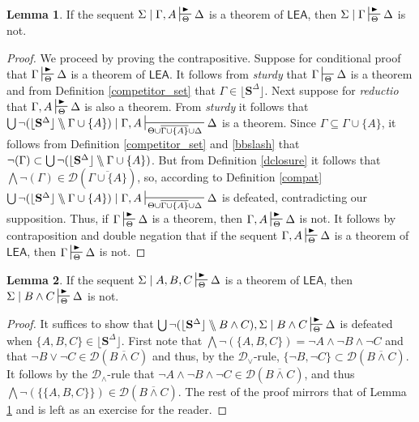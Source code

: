 \documentclass{article}
\theoremstyle{definition}
\theoremstyle{definition}
\theoremstyle{definition}
\newtheorem{lemma}{Lemma}
\theoremstyle{definition}
\theoremstyle{remark}
\theoremstyle{definition}
\theoremstyle{definition}
\begin{document}
\begin{lemma}\label{Minim}
	If the sequent $ \Sigma\mid \Gamma, A \sststile{\Theta}{\RHD} \Delta $ is a theorem of $ \mathsf{LEA}$, then  $ \Sigma\mid \Gamma \sststile{\Theta}{\RHD} \Delta $ is not.
	
	\begin{proof}
		We proceed by proving the contrapositive. Suppose for conditional proof that $ \Gamma\sststile{\Theta}{\RHD} \Delta $ is a theorem of $ \mathsf{LEA}$. It follows from \textit{sturdy} that $ \Gamma\sststile{\Theta}{} \Delta $ is a theorem and from Definition \ref{competitor_set} that $ \Gamma \in \lfloor \mathbf{S}^\Delta \rfloor$. Next suppose for \textit{reductio} that $ \Gamma, A \sststile{\Theta}{\RHD} \Delta $ is also a theorem. From \textit{sturdy} it follows that $\bigcup\neg(\lfloor \mathbf{S}^\Delta \rfloor\bbslash\Gamma\cup \{A\})\mid\Gamma, A \sststile{\Theta\cup \overline{\Gamma\cup \{A\} }\cup\Delta}{}\Delta$ is a theorem. Since $ \Gamma \subseteq \Gamma\cup\{A\} $, it follows from Definition \ref{competitor_set} and \ref{bbslash} that $ \neg(\Gamma) \subset \bigcup\neg(\lfloor \mathbf{S}^\Delta \rfloor\bbslash\Gamma\cup \{A\}) $. But from Definition \ref{dclosure} it follows that $ \bigwedge\neg(\Gamma) \in \mathcal{D}(\overline{\Gamma\cup\{A\}}) $, so, according to Definition \ref{compat} $\bigcup\neg(\lfloor \mathbf{S}^\Delta \rfloor\bbslash\Gamma\cup \{A\})\mid\Gamma, A \sststile{\Theta\cup \overline{\Gamma\cup \{A\} }\cup\Delta}{}\Delta$ is defeated, contradicting our supposition. Thus, if  $ \Gamma\sststile{\Theta}{\RHD} \Delta $ is a theorem, then $ \Gamma, A \sststile{\Theta}{\RHD} \Delta $ is not. It follows by contraposition and double negation that if the sequent $ \Gamma, A \sststile{\Theta}{\RHD} \Delta $ is a theorem of $ \mathsf{LEA}$, then  $ \Gamma \sststile{\Theta}{\RHD} \Delta $ is not.
	\end{proof}
\end{lemma}

\begin{lemma}\label{Minimand}
	If the sequent $ \Sigma\mid A, B, C \sststile{\Theta}{\RHD} \Delta $ is a theorem of $ \mathsf{LEA}$, then  $ \Sigma\mid B\wedge C \sststile{\Theta}{\RHD} \Delta $ is not.
	
	\begin{proof}
		It suffices to show that  $ \bigcup\neg(\lfloor \mathbf{S}^\Delta \rfloor\bbslash B\wedge C), \Sigma\mid B\wedge C \sststile{\Theta}{\RHD} \Delta $ is defeated when $\{A, B, C\} \in \lfloor \mathbf{S}^\Delta \rfloor$. First note that $ \bigwedge\neg(\{A,B,C\})= \neg A \wedge \neg B \wedge \neg C $ and that $ \neg B \vee \neg C \in \mathcal{D}(\overline{B\wedge C}) $ and thus, by the $ \mathcal{D}_\vee $-rule,  $ \{\neg B, \neg C\} \subset \mathcal{D}(\overline{B\wedge C}) $. It  follows by the $ \mathcal{D}_\wedge $-rule that $ \neg A \wedge \neg B \wedge \neg C \in \mathcal{D}(\overline{B\wedge C}) $, and thus $ \bigwedge\neg(\{\{A,B,C\}\}) \in \mathcal{D}(\overline{B\wedge C}) $. The rest of the proof mirrors that of Lemma \ref{Minim} and is left as an exercise for the reader.
	\end{proof}
\end{lemma}
\end{document}
